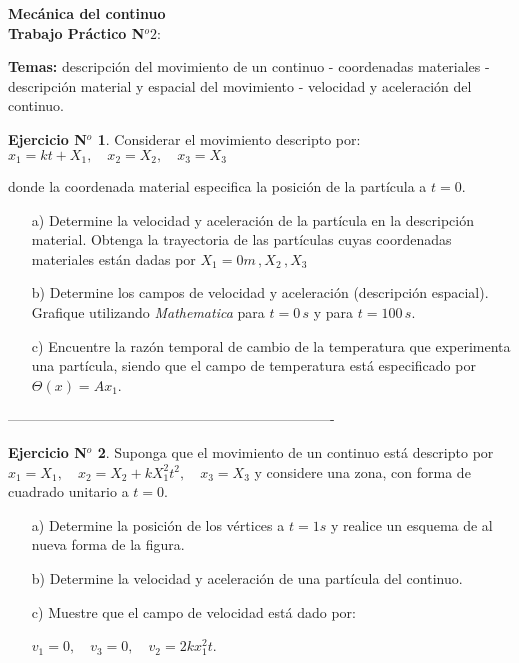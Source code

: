 \documentclass[11pt,a4paper]{article}
\theoremstyle{definition}
\newtheorem{example}{Ejercicio N$^o$}
\begin{document}
\begin{center}
{\bf \large Mecánica del continuo \\ Trabajo Práctico N$^o 2:$ }
\end{center}

\medskip

\noindent \textbf{Temas:} descripción del movimiento de un continuo - coordenadas materiales - descripción material y espacial del movimiento - velocidad y aceleración del continuo.



\begin{example}
Considerar el movimiento descripto por:
\center $x_1=kt+X_1, \quad x_2=X_2, \quad x_3=X_3$

\noindent donde la coordenada material especifica la posici\'on de la part\'icula a $t=0$.
\begin{itemize}

\item[a)] Determine la velocidad y aceleraci\'on de la part\'icula en la descripción material. Obtenga la trayectoria de las partículas cuyas coordenadas materiales están dadas por $X_1 = 0 m\, , X_2 \, , X_3 $

\item[b)] Determine los campos de velocidad y aceleración (descripción espacial). Grafique utilizando \textit{Mathematica} para $t = 0 \, s$ y para $t = 100 \, s$. 
 
\item[c)] Encuentre la razón temporal de cambio de la temperatura que experimenta una partícula, siendo que el campo de temperatura está especificado por $\Theta(x)=A x_1$. 

\end{itemize}

\end{example}

\center ----------------------------------------------------------------------


\begin{example}

Suponga que el movimiento de un continuo está descripto por $x_1=X_1, \quad x_2=X_2+kX_1^2t^2, \quad x_3=X_3$ y considere una zona, con forma de cuadrado unitario a $t=0$. 

\begin{itemize}

\item[a)] Determine la posición de los vértices a $t=1s$ y realice un esquema de al nueva forma de la figura.
\item[b)] Determine la velocidad y aceleración de una partícula del continuo.
\item[c)] Muestre que el campo de velocidad está dado por: 

\center $v_1=0, \quad v_3=0, \quad v_2=2 k x_1^2 t$.    
\end{itemize}
\end{example}
\end{document}
